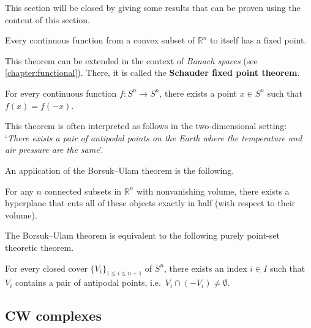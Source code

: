     This section will be closed by giving some results that can be proven using the content of this section.
    \begin{theorem}
        Every continuous function from a convex subset of $\mathbb{R}^n$ to itself has a fixed point.
    \end{theorem}
    This theorem can be extended in the context of \textit{Banach spaces} (see \cref{chapter:functional}). There, it is called the \textbf{Schauder fixed point theorem}.

    \begin{theorem}
        For every continuous function $f:S^n\rightarrow S^n$, there exists a point $x\in S^n$ such that $f(x)=f(-x)$.
    \end{theorem}
    This theorem is often interpreted as follows in the two-dimensional setting: `\textit{There exists a pair of antipodal points on the Earth where the temperature and air pressure are the same}'.

    An application of the Borsuk--Ulam theorem is the following.
    \begin{theorem}
        For any $n$ connected subsets in $\mathbb{R}^n$ with nonvanishing volume, there exists a hyperplane that cuts all of these objects exactly in half (with respect to their volume).
    \end{theorem}

    The Borsuk--Ulam theorem is equivalent to the following purely point-set theoretic theorem.
    \begin{theorem}
        For every closed cover $\{V_i\}_{1\leq i\leq n+1}$ of $S^n$, there exists an index $i\in I$ such that $V_i$ contains a pair of antipodal points, i.e.~$V_i\cap(-V_i)\neq\emptyset$.
    \end{theorem}

\subsection{CW complexes}\label{section:cw_complex}


